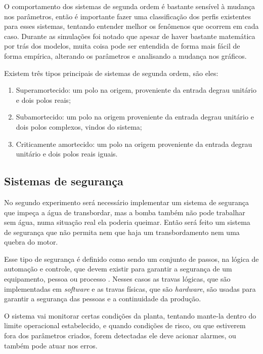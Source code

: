 \documentclass[
	12pt,				%
	openany,			%
	oneside,			%
	a4paper,			%
	english,			%
	french,				%
	spanish,			%
	brazil,				%
	]{abntex2}
\begin{document}
{O comportamento dos sistemas de segunda ordem é bastante sensível à mudança nos parâmetros, então é importante fazer uma classificação dos perfis existentes para esses sistemas, tentando entender melhor os fenômenos que ocorrem em cada caso. Durante as simulações foi notado que apesar de haver bastante matemática por trás dos modelos, muita coisa pode ser entendida de forma mais fácil de forma empírica, alterando os parâmetros e analisando a mudança nos gráficos.

Existem três tipos principais de sistemas de segunda ordem, são eles:
\begin{enumerate}
	\item Superamortecido: um polo na origem, proveniente da entrada degrau unitário e dois polos reais;
	
	\item Subamortecido: um polo na origem proveniente da entrada degrau unitário e dois polos complexos, vindos do sistema;
	
	\item Criticamente amortecido: um polo na origem proveniente da entrada degrau unitário e dois polos reais iguais.		
\end{enumerate}

\subsection{Sistemas de segurança}

No segundo experimento será necessário implementar um sistema de segurança que impeça a água de transbordar, mas a bomba também não pode trabalhar sem água, numa situação real ela poderia queimar. Então será feito um sistema de segurança que não permita nem que haja um transbordamento nem uma quebra do motor. 

Esse tipo de segurança é definido como sendo um conjunto de passos, na lógica de automação e controle, que devem existir para garantir a segurança de um equipamento, pessoa ou processo \cite{meneghetti1}. Nesses casos as travas lógicas, que são implementadas em \textit{software} e as travas físicas, que são \textit{hardware}, são usadas para garantir a segurança das pessoas e a continuidade da produção.

O sistema vai monitorar certas condições da planta, tentando mante-la dentro do limite operacional estabelecido, e quando condições de risco, ou que estiverem fora dos parâmetros criados, forem detectadas ele deve acionar alarmes, ou também pode atuar nos erros.

}
\end{document}
